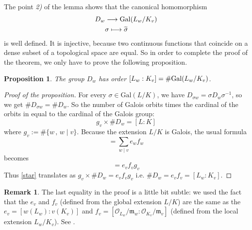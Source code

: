 \documentclass[12pt,a4paper,english]{article}
\theoremstyle{definition}
\newtheorem*{rem}{Remark}
\theoremstyle{plain}
\newtheorem*{prop}{Proposition}
\begin{document}
The point \textit{2)} of the lemma shows that the canonical homomorphism 
\begin{align*}
D_w &\longrightarrow \text{\normalfont Gal}(L_w/K_v)\\
&\sigma\longmapsto\widetilde{\sigma}
\end{align*}
is well defined. It is injective, because two continuous functions that coincide on a dense subset of a topological space are equal. So in order to complete the proof of the theorem, we only have to prove the following proposition.
\vspace{0.5cm}

\begin{prop}
The group $D_w$ has order $[L_w:K_v]=\#\text{\normalfont Gal}(L_w/K_v)$.
\end{prop}

\begin{proof}[Proof of the proposition]
For every $ \sigma\in \text{Gal}(L/K)$, we have $D_{\sigma w}=\sigma D_{w}\sigma^{-1}$, so we get $\# D_{\sigma w}=\# D_{w}$. So the number of Galois orbits times the cardinal of the orbits in equal to the cardinal of the Galois group:
\begin{equation}\label{star}
   g_v\times \#D_{w}=[L:K]
\end{equation}
where $g_v:=\#\{w\,,\,w\mid v\}$.
Because the extension $L/K$ is Galois, the usual formula
\begin{equation*}
   [L:K]=\sum_{w\mid v}e_w f_w
\end{equation*}
becomes
\begin{equation*}
   [L:K]=e_v f_v g_v
\end{equation*}
Thus \eqref{star} translates as $g_v\times \#D_{w}=e_v f_v g_v$ i.e. $\#D_{w}=e_v f_v=[L_w:K_v]$.
\end{proof}
\vspace{0.5cm}

\begin{rem}
The last equality in the proof is a little bit subtle: we used the fact that the $e_v$ and $f_v$ (defined from the global extension $L/K$) are the same as the $e_v=[w(L_w):v(K_v)]$ and $f_v=[\mathcal{O}_{L_w}/\mathfrak{m}_w: \mathcal{O}_{K_v}/\mathfrak{m}_v]$ (defined from the local extension $L_w/K_v$). See \cite[p.31]{clserre}.
\end{rem}



\end{document}
